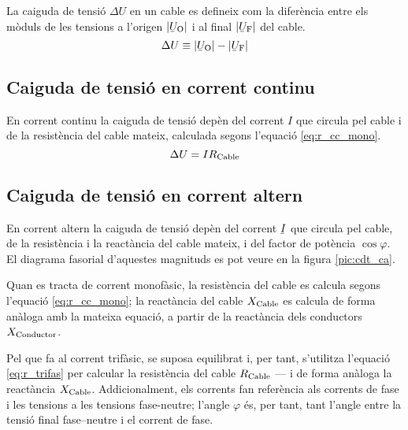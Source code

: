 La caiguda de tensió $\Delta U$ en un cable es defineix com la diferència entre els mòduls de les tensions a l'origen $|{\cmplx{U}\ped{O}}|$ i al final $|\cmplx{U}\ped{F}|$ del cable.
\begin{equation}
   \Delta U \equiv |\cmplx{U}\ped{O}| - |\cmplx{U}\ped{F}|
\end{equation}

\subsection{Caiguda de tensió en corrent continu}

En corrent continu la caiguda de tensió depèn del corrent $I$ que circula pel cable i de la  resistència del  cable mateix, calculada segons l'equació \eqref{eq:r_cc_mono}.
\begin{equation}
   \Delta U = I R_\mathrm{Cable}
\end{equation}

\subsection{Caiguda de tensió en corrent altern}

En corrent altern la caiguda de tensió
depèn del  corrent $\cmplx{I}$ que circula pel cable, de la
resistència i la reactància del  cable mateix, i del factor de
potència $\cos \varphi$. El diagrama fasorial d'aquestes magnituds
es pot veure en la figura \vref{pic:cdt_ca}.

\begin{center}
   
   \label{pic:cdt_ca}
\end{center}

Quan es tracta de corrent monofàsic, la resistència del cable es calcula segons l'equació
\eqref{eq:r_cc_mono}; la reactància del cable $X_\mathrm{Cable}$ es calcula de forma anàloga
amb la mateixa equació, a partir de la reactància dels conductors $X_\mathrm{Conductor}$.

Pel que fa al corrent trifàsic, se suposa equilibrat i, per tant, s'utilitza l'equació
\eqref{eq:r_trifas} per calcular la resistència del cable $R_\mathrm{Cable}$ --- i de forma
anàloga la reactància $X_\mathrm{Cable}$. Addicionalment, els corrents fan referència als
corrents de fase i les tensions a les tensions fase-neutre; l'angle $\varphi$ és, per tant,
tant l'angle entre la tensió final fase--neutre i el corrent de fase.

